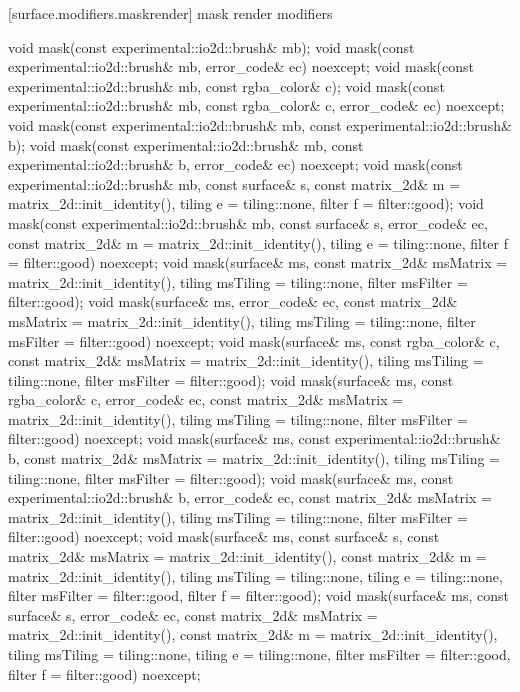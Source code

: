  [surface.modifiers.maskrender] { mask render modifiers}

\begin{itemdecl}
void mask(const experimental::io2d::brush& mb);
void mask(const experimental::io2d::brush& mb, error_code& ec)
  noexcept;
void mask(const experimental::io2d::brush& mb, const rgba_color& c);
void mask(const experimental::io2d::brush& mb, const rgba_color& c, 
  error_code& ec) noexcept;
void mask(const experimental::io2d::brush& mb,
  const experimental::io2d::brush& b);
void mask(const experimental::io2d::brush& mb,
  const experimental::io2d::brush& b, error_code& ec) noexcept;
void mask(const experimental::io2d::brush& mb, const surface& s,
  const matrix_2d& m = matrix_2d::init_identity(), tiling e = tiling::none, 
  filter f = filter::good);
void mask(const experimental::io2d::brush& mb, const surface& s, error_code& ec,
  const matrix_2d& m = matrix_2d::init_identity(), tiling e = tiling::none,
  filter f = filter::good) noexcept;
void mask(surface& ms,
  const matrix_2d& msMatrix = matrix_2d::init_identity(),
  tiling msTiling = tiling::none, filter msFilter = filter::good);
void mask(surface& ms, error_code& ec, 
  const matrix_2d& msMatrix = matrix_2d::init_identity(),
  tiling msTiling = tiling::none, filter msFilter = filter::good) noexcept;
void mask(surface& ms, const rgba_color& c,
  const matrix_2d& msMatrix = matrix_2d::init_identity(),
  tiling msTiling = tiling::none, filter msFilter = filter::good);
void mask(surface& ms, const rgba_color& c, error_code& ec, 
  const matrix_2d& msMatrix = matrix_2d::init_identity(),
  tiling msTiling = tiling::none, filter msFilter = filter::good) noexcept;
void mask(surface& ms, const experimental::io2d::brush& b, 
  const matrix_2d& msMatrix = matrix_2d::init_identity(),
  tiling msTiling = tiling::none, filter msFilter = filter::good);
void mask(surface& ms, const experimental::io2d::brush& b, error_code& ec,
  const matrix_2d& msMatrix = matrix_2d::init_identity(),
  tiling msTiling = tiling::none, filter msFilter = filter::good) noexcept;
void mask(surface& ms, const surface& s,
  const matrix_2d& msMatrix = matrix_2d::init_identity(),
  const matrix_2d& m = matrix_2d::init_identity(),
  tiling msTiling = tiling::none, tiling e = tiling::none,
  filter msFilter = filter::good, filter f = filter::good);
void mask(surface& ms, const surface& s, error_code& ec,
  const matrix_2d& msMatrix = matrix_2d::init_identity(),
  const matrix_2d& m = matrix_2d::init_identity(),
  tiling msTiling = tiling::none, tiling e = tiling::none,
  filter msFilter = filter::good, filter f = filter::good) noexcept;
\end{itemdecl}
